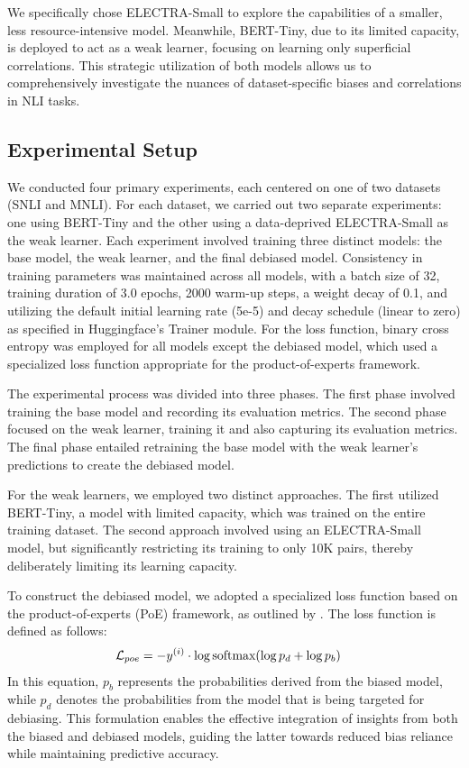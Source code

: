 \documentclass[11pt,a4paper]{article}
\begin{document}
We specifically chose ELECTRA-Small to explore the capabilities of a smaller, less resource-intensive model. Meanwhile, BERT-Tiny, due to its limited capacity, is deployed to act as a weak learner, focusing on learning only superficial correlations. This strategic utilization of both models allows us to comprehensively investigate the nuances of dataset-specific biases and correlations in NLI tasks.

\subsection{Experimental Setup}
We conducted four primary experiments, each centered on one of two datasets (SNLI and MNLI). For each dataset, we carried out two separate experiments: one using BERT-Tiny and the other using a data-deprived ELECTRA-Small as the weak learner. Each experiment involved training three distinct models: the base model, the weak learner, and the final debiased model. Consistency in training parameters was maintained across all models, with a batch size of 32, training duration of 3.0 epochs, 2000 warm-up steps, a weight decay of 0.1, and utilizing the default initial learning rate (5e-5) and decay schedule (linear to zero) as specified in Huggingface's Trainer module. For the loss function, binary cross entropy was employed for all models except the debiased model, which used a specialized loss function appropriate for the product-of-experts framework.

The experimental process was divided into three phases. The first phase involved training the base model and recording its evaluation metrics. The second phase focused on the weak learner, training it and also capturing its evaluation metrics. The final phase entailed retraining the base model with the weak learner's predictions to create the debiased model.

For the weak learners, we employed two distinct approaches. The first utilized BERT-Tiny, a model with limited capacity, which was trained on the entire training dataset. The second approach involved using an ELECTRA-Small model, but significantly restricting its training to only 10K pairs, thereby deliberately limiting its learning capacity.

To construct the debiased model, we adopted a specialized loss function based on the product-of-experts (PoE) framework, as outlined by \citet{hinton2002training}. The loss function is defined as follows:
\begin{align*}
\mathcal{L}_{poe} &= -y^{(i)}  \cdot \log \textnormal{softmax}(\log p_d + \log p_b)
\end{align*}
In this equation, $p_b$ represents the probabilities derived from the biased model, while $p_d$ denotes the probabilities from the model that is being targeted for debiasing. This formulation enables the effective integration of insights from both the biased and debiased models, guiding the latter towards reduced bias reliance while maintaining predictive accuracy.
\end{document}
